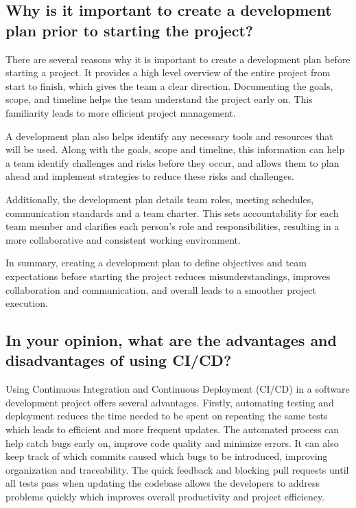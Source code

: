\documentclass{article}
\begin{document}
\subsection*{Why is it important to create a development plan prior to starting the project?}

There are several reasons why it is important to create a development plan before starting a project.
It provides a high level overview of the entire project from start to finish, which gives the team a 
clear direction. Documenting the goals, scope, and timeline helps the team understand the project early 
on. This familiarity leads to more efficient project management.

A development plan also helps identify any necessary tools and resources that will be used. Along with the 
goals, scope and timeline, this information can help a team identify challenges and risks before they occur,
and allows them to plan ahead and implement strategies to reduce these risks and challenges. 

Additionally, the development plan details team roles, meeting schedules, communication standards and a 
team charter. This sets accountability for each team member and clarifies each person's role and responsibilities,
resulting in a more collaborative and consistent working environment.

In summary, creating a development plan to define objectives and team expectations before starting the project 
reduces misunderstandings, improves collaboration and communication, and overall leads to a smoother project execution. 

\subsection*{In your opinion, what are the advantages and disadvantages of using CI/CD?}

Using Continuous Integration and Continuous Deployment (CI/CD) in a software development project offers several 
advantages. Firstly, automating testing and deployment reduces the time needed to be spent on repeating the same tests which
leads to efficient and more frequent updates. The automated process can help catch bugs early on, improve code quality 
and minimize errors. It can also keep track of which commits caused which bugs to be introduced, improving organization
and traceability. The quick feedback and blocking pull requests until all tests pass when updating the codebase allows 
the developers to address problems quickly which improves overall productivity and project efficiency.
\end{document}
